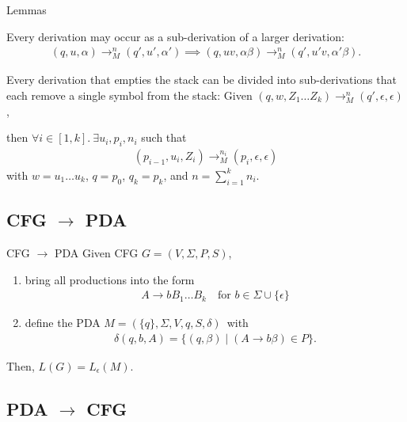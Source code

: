 \documentclass{beamer}
\begin{document}
\begin{frame}{Lemmas}
    \begin{lemma}
        Every derivation may occur as a sub-derivation of a larger derivation\pause:
        \begin{align*}
            (q,u,\alpha) \to_M^n (q',u',\alpha') \implies (q,uv,\alpha\beta) \to_M^n (q',u'v,\alpha'\beta).
        \end{align*}
    \end{lemma}\pause
    \begin{lemma}
        Every derivation that empties the stack can be divided into sub-derivations that each remove a single symbol from the stack\pause:
        Given $(q,w,Z_1 \dots Z_k) \to_M^n (q',\epsilon,\epsilon)$\pause,\par
        then $\forall i \in [1,k].\ \exists u_i, p_i, n_i$ such that \begin{align*}
            (p_{i-1},u_i,Z_i) \to_M^{n_i} (p_i,\epsilon,\epsilon)
        \end{align*} with $w = u_1 \dots u_k$, $q = p_0$, $q_k = p_k$, and $n = \sum_{i=1}^k n_i$.
    \end{lemma}
\end{frame}

\subsection{CFG $\to$ PDA}

\begin{frame}{CFG $\to$ PDA}
    Given CFG $G = (V,\Sigma,P,S)$,\pause
    \begin{enumerate}
        \item bring all productions into the form \begin{align*}
            A \to b B_1 \dots B_k \quad\text{for } b \in \Sigma \cup \{\epsilon\}
        \end{align*}\pause
        \item define the PDA $M = (\{q\},\Sigma,V,q,S,\delta)$\pause\ with \begin{align*}
            \delta(q,b,A) = \{(q,\beta) \mid (A \to b \beta) \in P\}.
        \end{align*}
    \end{enumerate}\pause
    Then, $L(G) = L_{\epsilon}(M)$.
\end{frame}

\subsection{PDA $\to$ CFG}
\end{document}

